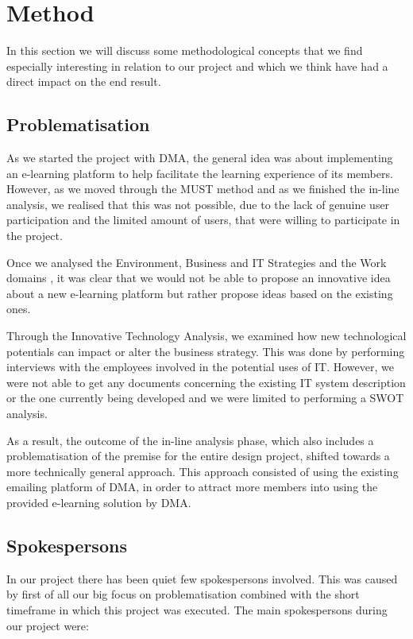 \section{Method}


In this section we will discuss some methodological concepts that we find especially interesting in relation to our project and which we think have had a direct impact on the end result. 

\subsection{Problematisation}
As we started the project with DMA, the general idea was about implementing an e-learning platform to help facilitate the learning experience of its members. However, as we moved through the MUST method and as we finished the in-line analysis, we realised that this was not possible, due to the lack of genuine user participation\cite{bodker} and the limited amount of users, that were willing to participate in the project. 

Once we analysed the Environment, Business and IT Strategies and the Work domains \cite{bodker}, it was clear that we would not be able to propose an innovative idea about a new e-learning platform but rather propose ideas based on the existing ones. 

Through the Innovative Technology Analysis\cite{bodker}, we examined how new technological potentials can impact or alter the business strategy. This was done by performing interviews with the employees involved in the potential uses of IT. However, we were not able to get any documents concerning the existing IT system description or the one currently being developed and we were limited to performing a SWOT analysis.

As a result, the outcome of the in-line analysis phase, which also includes a problematisation of the premise for the entire design project, shifted towards a more technically general approach. This approach consisted of using the existing emailing platform of DMA, in order to attract more members into using the provided e-learning solution by DMA.


\subsection{Spokespersons}
In our project there has been quiet few spokespersons involved. This was caused by first of all our big focus on problematisation combined with the short timeframe in which this project was executed. The main spokespersons during our project were:

